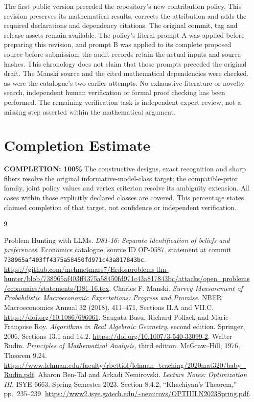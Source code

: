 \documentclass[11pt]{article}
\begin{document}
The first public version preceded the repository's new contribution policy. This revision preserves its mathematical results, corrects the attribution and adds the required declarations and dependency citations. The original commit, tag and release assets remain available. The policy's literal prompt A was applied before preparing this revision, and prompt B was applied to its complete proposed source before submission; the audit records retain the actual inputs and source hashes. This chronology does not claim that those prompts preceded the original draft. The Manski source and the cited mathematical dependencies were checked, as were the catalogue's two earlier attempts. No exhaustive literature or novelty search, independent human verification or formal proof checking has been performed. The remaining verification task is independent expert review, not a missing step asserted within the mathematical argument.

\clearpage
\section{Completion Estimate}
\noindent\textbf{COMPLETION: 100\%}
The constructive designs, exact recognition and sharp fibers resolve the original informative-model-class target; the compatible-prior family, joint policy values and vertex criterion resolve its ambiguity extension. All cases within those explicitly declared classes are covered. This percentage states claimed completion of that target, not confidence or independent verification.

\begin{thebibliography}{9}
\raggedright
{} Problem Hunting with LLMs.
\emph{D81-16: Separate identification of beliefs and preferences}.
Economics catalogue, source ID OP-0587, statement at commit
\texttt{738965af403ff4375a58450fd971c43a817843bc}.
\url{https://github.com/mehmetmars7/Erdosproblems-llm-hunter/blob/738965af403ff4375a58450fd971c43a817843bc/attacks/open_problems/economics/statements/D81-16.tex}.
 Charles F. Manski.
\emph{Survey Measurement of Probabilistic Macroeconomic Expectations: Progress and Promise}.
NBER Macroeconomics Annual 32 (2018), 411--471, Sections II.A and VII.C.
\url{https://doi.org/10.1086/696061}.
 Saugata Basu, Richard Pollack and Marie-Fran\c{c}oise Roy.
\emph{Algorithms in Real Algebraic Geometry}, second edition.
Springer, 2006, Sections 13.1 and 14.2.
\url{https://doi.org/10.1007/3-540-33099-2}.
 Walter Rudin.
\emph{Principles of Mathematical Analysis}, third edition.
McGraw--Hill, 1976, Theorem 9.24.
\url{https://www.lehman.edu/faculty/rbettiol/lehman_teaching/2020mat320/baby_Rudin.pdf}.
 Aharon Ben-Tal and Arkadi Nemirovski.
\emph{Lecture Notes: Optimization III}, ISYE 6663, Spring Semester 2023.
Section 8.4.2, ``Khachiyan's Theorem,'' pp.\ 235--239.
\url{https://www2.isye.gatech.edu/~nemirovs/OPTIIILN2023Spring.pdf}.
\end{thebibliography}
\end{document}
